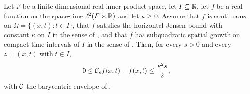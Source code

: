 \begin{lemma}
Let $F$ be a finite-dimensional real inner-product space, let $I\subseteq\mathbb{R}$, let
$f$ be a real function on the space-time $\ell^2(F\times\mathbb{R})$ and let
$\kappa\ge0$. Assume that $f$ is continuous on $\Omega=\{(x,t):t\in I\}$, that
$f$ satisfies the horizontal Jensen bound with
constant $\kappa$ on $I$ in the sense of , and that $f$
has subquadratic spatial growth on compact time intervals of $I$ in the sense of
. Then, for every $s>0$ and every $z=(x,t)$ with
$t\in I$,
\begin{equation}\label{eq:barycentric-sandwich}
  0\le\mathcal{C}_s f(x,t)-f(x,t)\le\frac{\kappa^2s}{2},
\end{equation}
with $\mathcal{C}$ the barycentric envelope of .
\end{lemma}
